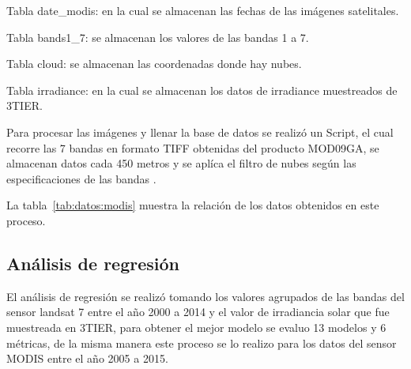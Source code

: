 Tabla date\_modis: en la cual se almacenan las fechas de las imágenes satelitales.

Tabla bands1\_7: se almacenan los valores de las bandas 1 a 7. 

Tabla cloud: se almacenan las coordenadas donde hay nubes.

Tabla irradiance: en la cual se almacenan los datos de irradiance muestreados de 3TIER.

Para procesar las imágenes y llenar la base de datos se realizó un Script, el cual recorre las 7 bandas en formato TIFF obtenidas del producto 
MOD09GA, se almacenan datos cada 450 metros y se aplíca el filtro de nubes según las especificaciones de las bandas \cite{bandMODISspecification}.

La tabla~\ref{tab:datos:modis} muestra la relación de los datos obtenidos en este proceso.

\begin{table}
\caption{Datos obtenidos en en el proceso de procesamiento y limpieza  de datos MODIS}
\label{tab:datos:modis}
\centering
{}
\end{table}

\subsection{Análisis de regresión}

El análisis de regresión se realizó tomando los valores agrupados de las bandas del sensor landsat 7 entre el año 2000 a 2014
y el valor de irradiancia solar que fue muestreada en 3TIER, para obtener el mejor modelo se evaluo 13 modelos y
6 métricas, de la misma manera este proceso se lo realizo para los datos del sensor MODIS entre el año 2005 a 2015.

